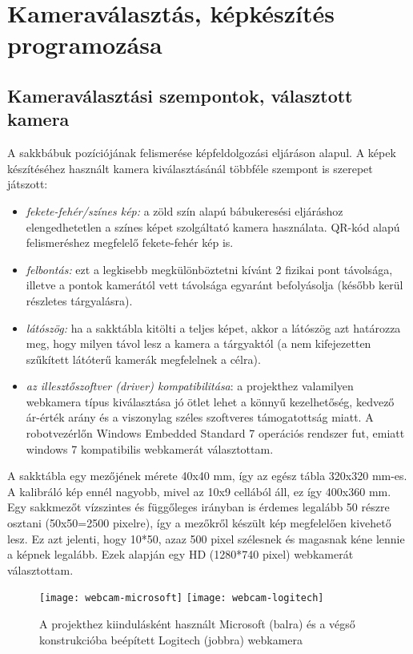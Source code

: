 \documentclass[../documentation.tex]{subfiles}
\begin{document}
\section{Kameraválasztás, képkészítés programozása}
\subsection{Kameraválasztási szempontok, választott kamera}
A sakkbábuk pozíciójának felismerése képfeldolgozási eljáráson alapul. A képek készítéséhez használt kamera kiválasztásánál többféle szempont is szerepet játszott:
\begin{itemize}
	\item \textit{fekete-fehér/színes kép:} a zöld szín alapú bábukeresési eljáráshoz elengedhetetlen a színes képet szolgáltató kamera használata. QR-kód alapú felismeréshez megfelelő fekete-fehér kép is.
	\item \textit{felbontás:} ezt a legkisebb megkülönböztetni kívánt 2 fizikai pont távolsága, illetve a pontok kamerától vett távolsága egyaránt befolyásolja (később kerül részletes tárgyalásra).
	\item \textit{látószög:} ha a sakktábla kitölti a teljes képet, akkor a látószög azt határozza meg, hogy milyen távol lesz a kamera a tárgyaktól (a nem kifejezetten szűkített látóterű kamerák megfelelnek a célra).
	\item \textit{az illesztőszoftver (driver) kompatibilitása}: a projekthez valamilyen webkamera típus kiválasztása jó ötlet lehet a könnyű kezelhetőség, kedvező ár-érték arány és a viszonylag széles szoftveres támogatottság miatt. A robotvezérlőn Windows Embedded Standard 7 operációs rendszer fut, emiatt windows 7 kompatibilis webkamerát választottam.
\end{itemize} 

A sakktábla egy mezőjének mérete 40x40 mm, így az egész tábla 320x320 mm-es. A kalibráló kép ennél nagyobb, mivel az 10x9 cellából áll, ez így 400x360 mm. Egy sakkmezőt vízszintes és függőleges irányban is érdemes legalább 50 részre osztani (50x50=2500 pixelre), így a mezőkről készült kép megfelelően kivehető lesz. Ez azt jelenti, hogy 10*50, azaz 500 pixel szélesnek és magasnak kéne lennie a képnek legalább. Ezek alapján egy HD (1280*740 pixel) webkamerát választottam. 

\begin{figure}[h]
	\centering
	\texttt{[image: webcam-microsoft]}
	\texttt{[image: webcam-logitech]}
	\caption{A projekthez kiindulásként használt Microsoft (balra) és a végső konstrukcióba beépített Logitech (jobbra) webkamera\protect\footnotemark}
	\label{fig:camera}
\end{figure}
\end{document}
